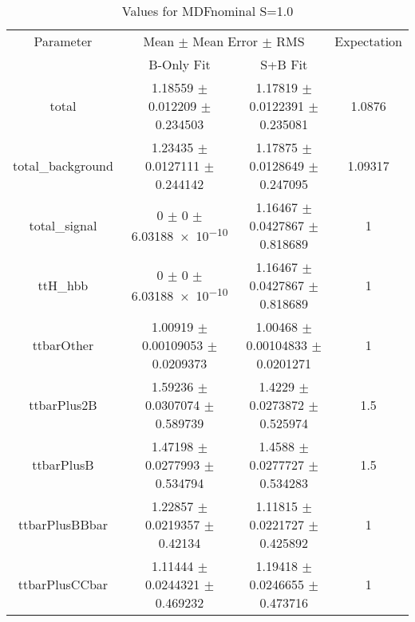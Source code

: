 \begin{table}
\centering
\caption{Values for MDFnominal S=1.0}
\begin{tabular}{cccc}
\toprule
Parameter & \multicolumn{2}{c}{Mean $\pm$ Mean Error $\pm$ RMS} & Expectation\\
 & B-Only Fit & S+B Fit & \\
\midrule
total & \num{1.18559} $\pm$ \num{0.012209} $\pm$ \num{0.234503} & \num{1.17819} $\pm$ \num{0.0122391} $\pm$ \num{0.235081} & \num{1.0876}\\
total\_background & \num{1.23435} $\pm$ \num{0.0127111} $\pm$ \num{0.244142} & \num{1.17875} $\pm$ \num{0.0128649} $\pm$ \num{0.247095} & \num{1.09317}\\
total\_signal & \num{0} $\pm$ \num{0} $\pm$ \num{6.03188e-10} & \num{1.16467} $\pm$ \num{0.0427867} $\pm$ \num{0.818689} & \num{1}\\
ttH\_hbb & \num{0} $\pm$ \num{0} $\pm$ \num{6.03188e-10} & \num{1.16467} $\pm$ \num{0.0427867} $\pm$ \num{0.818689} & \num{1}\\
ttbarOther & \num{1.00919} $\pm$ \num{0.00109053} $\pm$ \num{0.0209373} & \num{1.00468} $\pm$ \num{0.00104833} $\pm$ \num{0.0201271} & \num{1}\\
ttbarPlus2B & \num{1.59236} $\pm$ \num{0.0307074} $\pm$ \num{0.589739} & \num{1.4229} $\pm$ \num{0.0273872} $\pm$ \num{0.525974} & \num{1.5}\\
ttbarPlusB & \num{1.47198} $\pm$ \num{0.0277993} $\pm$ \num{0.534794} & \num{1.4588} $\pm$ \num{0.0277727} $\pm$ \num{0.534283} & \num{1.5}\\
ttbarPlusBBbar & \num{1.22857} $\pm$ \num{0.0219357} $\pm$ \num{0.42134} & \num{1.11815} $\pm$ \num{0.0221727} $\pm$ \num{0.425892} & \num{1}\\
ttbarPlusCCbar & \num{1.11444} $\pm$ \num{0.0244321} $\pm$ \num{0.469232} & \num{1.19418} $\pm$ \num{0.0246655} $\pm$ \num{0.473716} & \num{1}\\
\bottomrule
\end{tabular}
\end{table}